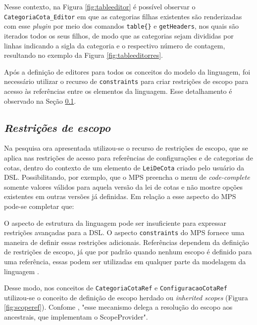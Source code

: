 Nesse contexto, na Figura \ref{fig:tableeditor} é possível observar o \texttt{CategoriaCota\_Editor} em que as categorias filhas existentes são renderizadas com esse \textit{plugin} por meio dos comandos \texttt{table\{\}} e \texttt{getHeaders}, nos quais são iterados todos os seus filhos, de modo que as categorias sejam divididas por linhas indicando a sigla da categoria e o respectivo número de contagem, resultando no exemplo da Figura \ref{fig:tableeditorres}.





\newpage
Após a definição de editores para todos os conceitos do modelo da linguagem, foi necessário utilizar o recurso de \texttt{constraints} para criar restrições de escopo para acesso às referências entre os elementos da linguagem. Esse detalhamento é observado na Seção \ref{sub:sec:constraints}.

\subsection{\textit{Restrições de escopo}}
\label{sub:sec:constraints}

Na pesquisa ora apresentada utilizou-se o recurso de restrições de escopo, que se aplica nas restrições de acesso para referências de configurações e de categorias de cotas, dentro do contexto de um elemento de \texttt{LeiDeCota} criado pelo usuário da DSL. Possibilitando, por exemplo, que o \gls{MPS} preencha o menu de \textit{code-complete} somente valores válidos para aquela versão da lei de cotas e não mostre opções existentes em  outras versões já definidas. Em relação a esse aspecto do MPS pode-se completar que:
 
\begin{citacao}
O aspecto de estrutura da linguagem pode ser insuficiente para expressar restrições avançadas para a DSL. O aspecto \texttt{constraints} do MPS fornece uma maneira de definir essas restrições adicionais. Referências dependem da definição de restrições de escopo, já que por padrão quando nenhum escopo é definido para uma referência, essas podem ser utilizadas em qualquer parte da modelagem da linguagem \cite[s/p, tradução nossa]{jetbrains}.
\end{citacao}

Desse modo, nos conceitos de \texttt{CategoriaCotaRef} e \texttt{ConfiguracaoCotaRef} utilizou-se o conceito de definição de escopo herdado ou \textit{inherited scopes} (Figura \ref{fig:scoperef}). Confome , "esse mecanismo delega a resolução do escopo aos ancestrais, que implementam o ScopeProvider".

